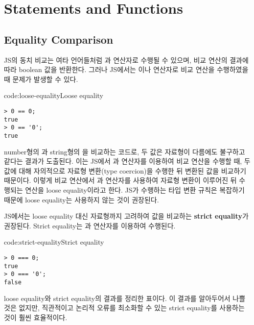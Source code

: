\section{Statements and Functions}\label{statements-functions}

\subsection*{Equality Comparison}

JS의 동치 비교는 여타 언어들처럼 \cd{==}과 \cd{!=} 연산자로 수행될 수 있으며, 비교 연산의 결과에 따라 boolean 값을 반환한다. 그러나 JS에서는 \cd{==}이나 \cd{!=} 연산자로 비교 연산을 수행하였을 때 문제가 발생할 수 있다.

\begin{code}{code:loose-equality}{Loose equality}
\begin{verbatim}
> 0 == 0;
true
> 0 == '0';
true
\end{verbatim}
\end{code}

\는 number형의 과 string형의 을 비교하는 코드로, 두 값은 자료형이 다름에도 불구하고 같다는 결과가 도출된다. 이는 JS에서 \cd{==}과 \cd{!=} 연산자를 이용하여 비교 연산을 수행할 때, 두 값에 대해 자의적으로 자료형 변환(type coercion)을 수행한 뒤 변환된 값을 비교하기 때문이다. 이렇게 비교 연산에서 \cd{==}과 \cd{!=} 연산자를 사용하여 자료형 변환이 이루어진 뒤 수행되는 연산을 loose equality이라고 한다. JS가 수행하는 타입 변환 규칙은 복잡하기 때문에 loose equality는 사용하지 않는 것이 권장된다.


JS에서는 loose equality 대신 자료형까지 고려하여 값을 비교하는 \textbf{strict equality}가 권장된다. Strict equality는 \cd{===}과 \cd{!==} 연산자를 이용하여 수행된다.

\begin{code}{code:strict-equality}{Strict equality}
\begin{verbatim}
> 0 === 0;
true
> 0 === '0';
false
\end{verbatim}
\end{code}

\은 loose equality와 strict equality의 결과를 정리한 표이다. 이 결과를 알아두어서 나쁠 것은 없지만, 직관적이고 논리적 오류를 최소화할 수 있는 strict equality를 사용하는 것이 훨씬 효율적이다.

